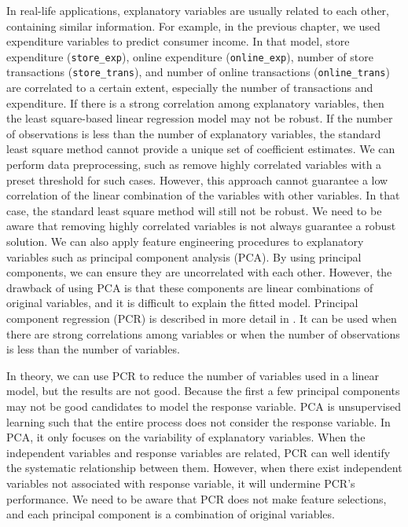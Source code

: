 \documentclass[12pt,]{krantz}
\begin{document}
In real-life applications, explanatory variables are usually related to each other, containing similar information. For example, in the previous chapter, we used expenditure variables to predict consumer income. In that model, store expenditure (\texttt{store\_exp}), online expenditure (\texttt{online\_exp}), number of store transactions (\texttt{store\_trans}), and number of online transactions (\texttt{online\_trans}) are correlated to a certain extent, especially the number of transactions and expenditure. If there is a strong correlation among explanatory variables, then the least square-based linear regression model may not be robust. If the number of observations is less than the number of explanatory variables, the standard least square method cannot provide a unique set of coefficient estimates. We can perform data preprocessing, such as remove highly correlated variables with a preset threshold for such cases. However, this approach cannot guarantee a low correlation of the linear combination of the variables with other variables. In that case, the standard least square method will still not be robust. We need to be aware that removing highly correlated variables is not always guarantee a robust solution. We can also apply feature engineering procedures to explanatory variables such as principal component analysis (PCA).  By using principal components, we can ensure they are uncorrelated with each other. However, the drawback of using PCA is that these components are linear combinations of original variables, and it is difficult to explain the fitted model. Principal component regression (PCR)  is described in more detail in \citep{Massy1965}. It can be used when there are strong correlations among variables or when the number of observations is less than the number of variables.

In theory, we can use PCR to reduce the number of variables used in a linear model, but the results are not good. Because the first a few principal components may not be good candidates to model the response variable. PCA is unsupervised learning such that the entire process does not consider the response variable. In PCA, it only focuses on the variability of explanatory variables. When the independent variables and response variables are related, PCR can well identify the systematic relationship between them. However, when there exist independent variables not associated with response variable, it will undermine PCR's performance. We need to be aware that PCR does not make feature selections, and each principal component is a combination of original variables.
\end{document}
